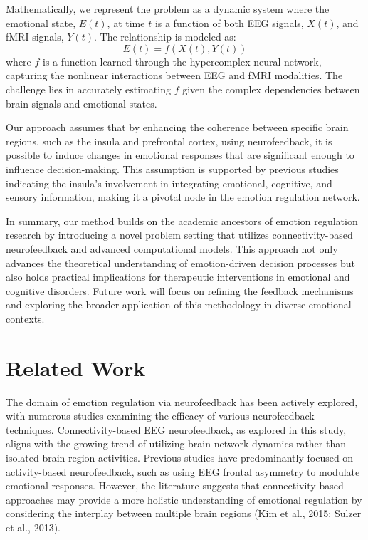 \documentclass{article}
\begin{document}
Mathematically, we represent the problem as a dynamic system where the emotional state, \(E(t)\), at time \(t\) is a function of both EEG signals, \(X(t)\), and fMRI signals, \(Y(t)\). The relationship is modeled as:
\[ E(t) = f(X(t), Y(t)) \]
where \(f\) is a function learned through the hypercomplex neural network, capturing the nonlinear interactions between EEG and fMRI modalities. The challenge lies in accurately estimating \(f\) given the complex dependencies between brain signals and emotional states.

Our approach assumes that by enhancing the coherence between specific brain regions, such as the insula and prefrontal cortex, using neurofeedback, it is possible to induce changes in emotional responses that are significant enough to influence decision-making. This assumption is supported by previous studies indicating the insula's involvement in integrating emotional, cognitive, and sensory information, making it a pivotal node in the emotion regulation network.

In summary, our method builds on the academic ancestors of emotion regulation research by introducing a novel problem setting that utilizes connectivity-based neurofeedback and advanced computational models. This approach not only advances the theoretical understanding of emotion-driven decision processes but also holds practical implications for therapeutic interventions in emotional and cognitive disorders. Future work will focus on refining the feedback mechanisms and exploring the broader application of this methodology in diverse emotional contexts.

\section{Related Work}
The domain of emotion regulation via neurofeedback has been actively explored, with numerous studies examining the efficacy of various neurofeedback techniques. Connectivity-based EEG neurofeedback, as explored in this study, aligns with the growing trend of utilizing brain network dynamics rather than isolated brain region activities. Previous studies have predominantly focused on activity-based neurofeedback, such as using EEG frontal asymmetry to modulate emotional responses. However, the literature suggests that connectivity-based approaches may provide a more holistic understanding of emotional regulation by considering the interplay between multiple brain regions (Kim et al., 2015; Sulzer et al., 2013).
\end{document}
